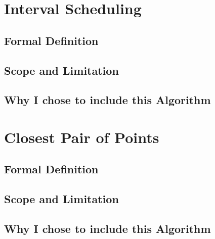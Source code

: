 \section{Interval Scheduling}
\subsection{Formal Definition}
\subsection{Scope and Limitation}
\subsection{Why I chose to include this Algorithm}
%
\section{Closest Pair of Points}
\subsection{Formal Definition}
\subsection{Scope and Limitation}
\subsection{Why I chose to include this Algorithm}